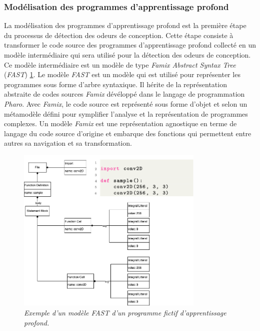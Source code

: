 \subsubsection{Modélisation des programmes d'apprentissage profond}
\label{sec:Meta-modélisation des programmes d'apprentissage profond}
La modélisation des programmes d'apprentissage profond est la première
étape du processus de détection des odeurs de conception. Cette étape consiste à transformer le code source des programmes
d'apprentissage profond collecté en un modèle intermédiaire qui sera utilisé pour la
détection des odeurs de conception. Ce modèle intermédiaire est un modèle de
type \emph{Famix Abstract Syntax Tree} (\emph{FAST}) \ref{fig:fast}. Le modèle \emph{FAST} est un modèle qui
est utilisé pour représenter les programmes sous forme d'arbre syntaxique. Il
hérite de la représentation abstraite de codes sources \emph{Famix} dévéloppé
dans le langage de programmation \emph{Pharo}. Avec \emph{Famix}, le code
source est représenté sous forme d'objet et selon un métamodèle défini pour symplifier l'analyse et
la représentation de programmes complexes. Un modèle \emph{Famix} est une
représentation agnostique en terme de langage du code source d'origine et embarque des
fonctions qui permettent entre autres sa navigation et sa transformation.\\

\begin{figure}[h]
  \centering
  \includegraphics[width=0.8\textwidth]{figure/fast.png}
  \caption{\emph{Exemple d'un modèle \emph{FAST} d'un programme fictif d'apprentissage profond.}}
  \label{fig:fast}
\end{figure}

